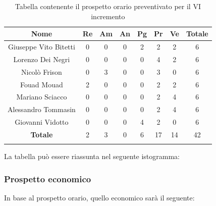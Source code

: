 			\begin{longtable}{|c|c|c|c|c|c|c|c}
				\hline
				\rowcolor{lighter-grayer}
				\textbf{Nome} & \textbf{Re} & \textbf{Am} & \textbf{An} & \textbf{Pg}  & \textbf{Pr}   & \textbf{Ve} & \textbf{Totale} \\
				\hline
				\endfirsthead
				\hline
				Giuseppe Vito Bitetti & 0 & 0 & 0 & 2 & 2 & 2 & 6\\
				\hline
				\hline
				Lorenzo Dei Negri & 0 & 0 & 0 & 0 & 4 & 2 & 6\\
				\hline
				\hline
				Nicolò Frison & 0 & 3 & 0 & 0 & 3 & 0 & 6\\
				\hline
				\hline
				Fouad Mouad & 2 & 0 & 0 & 0 & 2 & 2 & 6 \\
				\hline
				\hline
				Mariano Sciacco & 0 & 0 & 0 & 0 & 2 & 4 & 6\\
				\hline
				\hline
				Alessandro Tommasin & 0 & 0 & 0 & 0 & 2 & 4 & 6\\
				\hline
				\hline
				Giovanni Vidotto & 0 & 0 & 0 & 4 & 2 & 0 & 6\\
				\hline 
				\textbf{Totale} & 2 &  3 & 0 & 6 & 17 & 14 & 42 \\
				\hline  
				
				\caption{Tabella contenente il prospetto orario preventivato per il VI incremento}
			\end{longtable}
			\pagebreak	
			
			La tabella può essere riassunta nel seguente istogramma:
			
			
		\subsubsection{Prospetto economico}
			In base al prospetto orario, quello economico sarà il seguente: 
			
